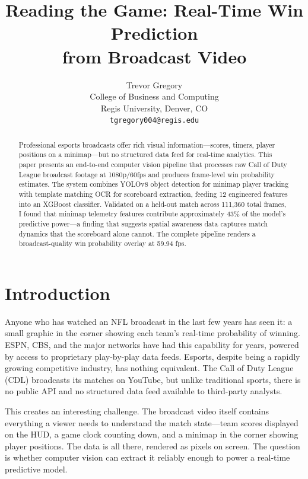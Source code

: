 \documentclass[10pt, twocolumn]{article}
\title{\Large\textbf{Reading the Game: Real-Time Win Prediction\\from Broadcast Video}}
\author{
    Trevor Gregory \\
    College of Business and Computing \\
    Regis University, Denver, CO \\
    \texttt{tgregory004@regis.edu}
}
\date{}
\begin{document}
\maketitle

\begin{abstract}
Professional esports broadcasts offer rich visual information---scores, timers, player positions on a minimap---but no structured data feed for real-time analytics. This paper presents an end-to-end computer vision pipeline that processes raw Call of Duty League broadcast footage at 1080p/60fps and produces frame-level win probability estimates. The system combines YOLOv8 object detection for minimap player tracking with template matching OCR for scoreboard extraction, feeding 12 engineered features into an XGBoost classifier. Validated on a held-out match across 111,360 total frames, I found that minimap telemetry features contribute approximately 43\% of the model's predictive power---a finding that suggests spatial awareness data captures match dynamics that the scoreboard alone cannot. The complete pipeline renders a broadcast-quality win probability overlay at 59.94 fps.
\end{abstract}

\section{Introduction}

Anyone who has watched an NFL broadcast in the last few years has seen it: a small graphic in the corner showing each team's real-time probability of winning. ESPN, CBS, and the major networks have had this capability for years, powered by access to proprietary play-by-play data feeds. Esports, despite being a rapidly growing competitive industry, has nothing equivalent. The Call of Duty League (CDL) broadcasts its matches on YouTube, but unlike traditional sports, there is no public API and no structured data feed available to third-party analysts.

This creates an interesting challenge. The broadcast video itself contains everything a viewer needs to understand the match state---team scores displayed on the HUD, a game clock counting down, and a minimap in the corner showing player positions. The data is all there, rendered as pixels on screen. The question is whether computer vision can extract it reliably enough to power a real-time predictive model.
\end{document}
